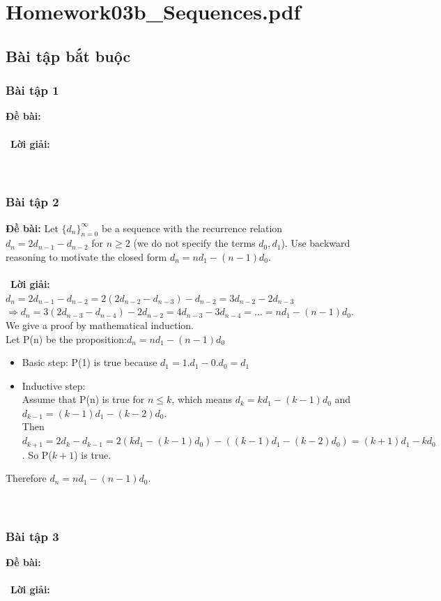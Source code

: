 \documentclass[a4paper]{article}
\begin{document}
\section{Homework03b\_Sequences.pdf}
\subsection{Bài tập bắt buộc}
\subsubsection{Bài tập 1}
\textbf{Đề bài:} 
\\\ \\\
\textbf{Lời giải:} \\\ \\\
\clearpage
\subsubsection{Bài tập 2}
\textbf{Đề bài:} Let $\{d_{n}\}^{\infty}_{n=0}$ be a sequence with the recurrence relation $d_{n}=2d_{n-1}-d_{n-2}$ for $n \geqslant 2$ (we do not specify the terms $d_{0},d_{1}$). Use backward reasoning to motivate the closed form $d_{n}=nd_{1}-(n-1)d_{0}$.
\\\ \\\
\textbf{Lời giải:} \\ $d_{n}=2d_{n-1}-d_{n-2}=2(2d_{n-2}-d_{n-3})-d_{n-2}=3d_{n-2}-2d_{n-3}$
\\ $\Rightarrow d_{n}=3(2d_{n-3}-d_{n-4})-2d_{n-2}=4d_{n-3}-3d_{n-4}=...=nd_{1}-(n-1)d_{0}$.
\\ We give a proof by mathematical induction.
\\ Let P(n) be the proposition:$d_{n}=nd_{1}-(n-1)d_{0}$
\begin{itemize}
\item Basic step: P(1) is true because $d_{1}=1.d_{1}-0.d_{0}=d_{1}$
\item Inductive step:
\\ Assume that P(n) is true for $n \leqslant k$, which means $d_{k}=kd_{1}-(k-1)d_{0}$ and $d_{k-1}=(k-1)d_{1}-(k-2)d_{0}$.
\\ Then $d_{k+1}=2d_{k}-d_{k-1}=2(kd_{1}-(k-1)d_{0})-((k-1)d_{1}-(k-2)d_{0})=(k+1)d_{1}-kd_{0}$. So P($k+1$) is true.
\end{itemize}
Therefore $d_{n}=nd_{1}-(n-1)d_{0}$. \\\ \\\
\clearpage
\subsubsection{Bài tập 3}
\textbf{Đề bài:} 
\\\ \\\
\textbf{Lời giải:} \\\ \\\
\clearpage
\end{document}
